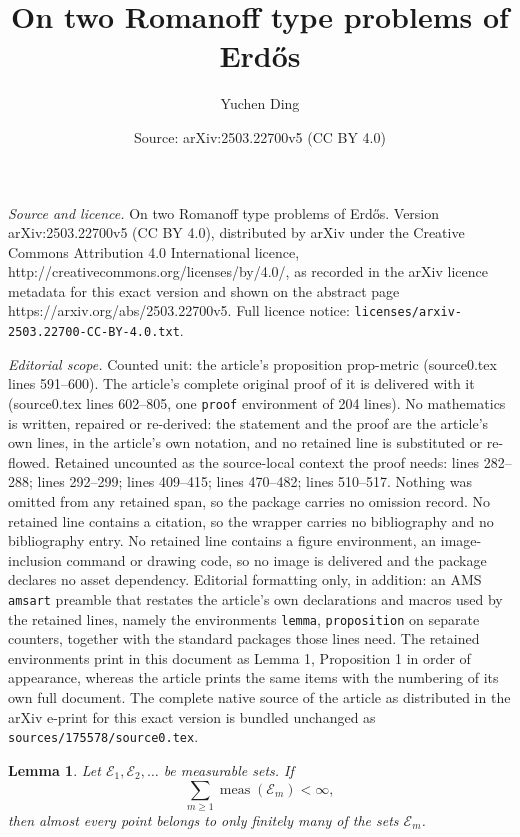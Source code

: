 \documentclass[10pt,a4paper]{amsart}
\title{On two Romanoff type problems of Erd\H{o}s}
\author{Yuchen Ding}
\date{Source: arXiv:2503.22700v5 (CC BY 4.0)}
\newtheorem{lemma}{Lemma}
\begin{document}
\maketitle

\noindent\emph{Source and licence.} On two Romanoff type problems of Erd\H{o}s. Version arXiv:2503.22700v5 (CC BY 4.0), distributed by arXiv under the Creative Commons Attribution 4.0 International licence, http://creativecommons.org/licenses/by/4.0/, as recorded in the arXiv licence metadata for this exact version and shown on the abstract page https://arxiv.org/abs/2503.22700v5. Full licence notice: \texttt{licenses/arxiv-2503.22700-CC-BY-4.0.txt}.\par\smallskip

\noindent\textit{Editorial scope.} Counted unit: the article's proposition prop-metric (source0.tex lines 591--600). The article's complete original proof of it is delivered with it (source0.tex lines 602--805, one \texttt{proof} environment of 204 lines). No mathematics is written, repaired or re-derived: the statement and the proof are the article's own lines, in the article's own notation, and no retained line is substituted or re-flowed.  Retained uncounted as the source-local context the proof needs: lines 282--288; lines 292--299; lines 409--415; lines 470--482; lines 510--517.  Nothing was omitted from any retained span, so the package carries no omission record.  No retained line contains a citation, so the wrapper carries no bibliography and no bibliography entry.  No retained line contains a figure environment, an image-inclusion command or drawing code, so no image is delivered and the package declares no asset dependency.  Editorial formatting only, in addition: an AMS \texttt{amsart} preamble that restates the article's own declarations and macros used by the retained lines, namely the environments \texttt{lemma}, \texttt{proposition} on separate counters, together with the standard packages those lines need.  The retained environments print in this document as Lemma 1, Proposition 1 in order of appearance, whereas the article prints the same items with the numbering of its own full document.  The complete native source of the article as distributed in the arXiv e-print for this exact version is bundled unchanged as \texttt{sources/175578/source0.tex}.
    \begin{lemma}\label{lem-borel-cantelli}
        Let $\mathcal{E}_1,\mathcal{E}_2,\ldots$ be measurable sets. If
        $$
        \sum_{m\ge1}\operatorname{meas}(\mathcal{E}_m)<\infty,
        $$
        then almost every point belongs to only finitely many of the sets $\mathcal{E}_m$.
    \end{lemma}
\end{document}

